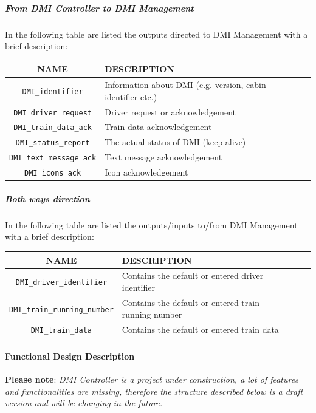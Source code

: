   \subparagraph{From DMI Controller to DMI Management}
  In the following table are listed the outputs directed to DMI Management with a brief description:\\
    \begin{tabular}{| c | l | l | l | l |}
      \hline
      \textbf{NAME} & \textbf{DESCRIPTION} \\ \hline
      \texttt{DMI\_identifier} & Information about DMI (e.g. version, cabin identifier etc.)\\
      \texttt{DMI\_driver\_request} & Driver request or acknowledgement\\
      \texttt{DMI\_train\_data\_ack} & Train data acknowledgement\\
      \texttt{DMI\_status\_report} & The actual status of DMI (keep alive)\\
      \texttt{DMI\_text\_message\_ack} & Text message acknowledgement\\
      \texttt{DMI\_icons\_ack} & Icon acknowledgement\\

      \hline
    \end{tabular} 
    \label{tbl:DMICtrToDMIMng}
    
\subparagraph{Both ways direction}
In the following table are listed the outputs/inputs  to/from DMI Management with a brief description:\\
  
    \begin{tabular}{| c | l | l | l | l |}
      \hline
      \textbf{NAME} & \textbf{DESCRIPTION} \\ \hline
      \texttt{DMI\_driver\_identifier} & Contains the default or entered driver identifier\\
      \texttt{DMI\_train\_running\_number} & Contains the default or entered train running number\\
      \texttt{DMI\_train\_data} & Contains the default or entered train data\\
      \hline
    \end{tabular} 
    \label{tbl:DMICtrToDMIMng}
  

\paragraph{Functional Design Description}
  \textbf{Please note}: \textit{DMI Controller is a project under construction, a lot of features and functionalities are missing, therefore the structure described below is a draft version and will be changing in the future.}
  
